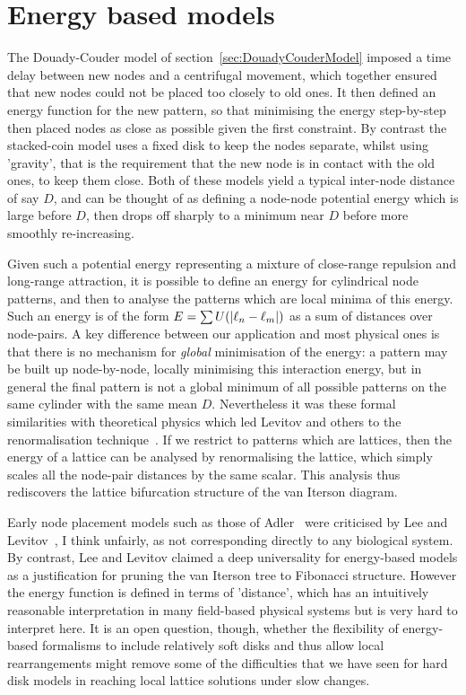 \section{Energy based models}
\label{sec:energy}
The Douady-Couder model of section~\ref{sec:DouadyCouderModel} imposed a time delay between new nodes and a centrifugal movement, which together ensured that new nodes could not be placed too closely to old ones. It then defined an energy function for the new pattern, so that minimising the energy step-by-step then placed nodes as close as possible given the first constraint.  By contrast the stacked-coin model uses a fixed disk to keep the nodes separate, whilst using 'gravity', that is the requirement that the new node is in contact with the old ones, to keep them close. Both of these models yield  a typical inter-node distance of say $D$, and can be thought of as defining a  node-node potential energy which is large before $D$, then drops off sharply to a minimum near $D$ before more smoothly re-increasing. 

Given such a potential energy representing a mixture of close-range repulsion and long-range attraction, it is possible to define an energy for cylindrical node patterns, and then to analyse the patterns which are local minima of this energy. Such an energy is of the form 
$E=\sum U(\left|\ell_{{n}}-\ell_{{m}}\right|)$ as a sum of distances over node-pairs.  {A key difference between our application and most physical ones is that there is no mechanism for \textit{global} minimisation of the energy: a pattern may be built up node-by-node, locally minimising this interaction energy, but in general the final pattern is not a global minimum of all possible patterns on the same cylinder with the same mean $D$.}
Nevertheless it was these formal similarities with theoretical physics which led Levitov and others to the renormalisation technique~\autocite{levitovFibonacciNumbersBotany1991}. If we restrict to patterns which are lattices, then the energy of a lattice can be analysed by renormalising the lattice, which simply scales all the node-pair distances by the same scalar. This analysis thus rediscovers the  lattice bifurcation structure of the van Iterson diagram.

 Early node placement models such as those of Adler~\autocite{adlerConsequencesContactPressure1977} were criticised by Lee and Levitov~\autocite{leeUniversalityPhyllotaxisMechanical1998}, I think unfairly, as not corresponding directly to any biological system. By contrast,
 Lee and Levitov claimed a deep universality for energy-based models as a justification for pruning the van Iterson tree to Fibonacci structure. However the energy function is defined in terms of 'distance', which has an intuitively reasonable interpretation in many field-based physical systems but is very hard to interpret here. It is an open question, though, whether the flexibility of  energy-based formalisms to include relatively soft disks and thus allow local rearrangements might remove some of the difficulties that we have seen for hard disk models in reaching local lattice solutions under slow changes. 
\newpage
